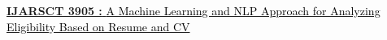 \begin{zitemize}
	\item{\href{https://ijarsct.co.in/Paper3905.pdf}{\textbf{IJARSCT 3905 :  }\textcolor{black}{A Machine Learning and NLP Approach for Analyzing Eligibility Based on Resume and CV}} }
\end{zitemize}